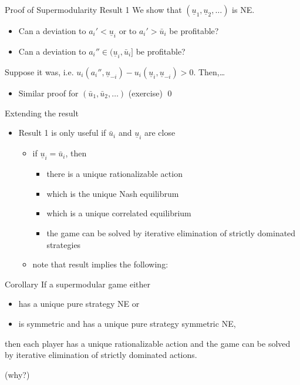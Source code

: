 \documentclass[bigger]{beamer}
\begin{document}
\begin{frame}[label={sec:orgheadline10}]{Proof of Supermodularity Result 1}
We show that \((\underline u_1,\underline u_2,\dots)\) is NE. 
\begin{itemize}
\item Can a deviation to \(a_i'<\underline u_i\) or to \(a_i'>\bar u_i\) be profitable?
\end{itemize}

\vspace*{2cm}

\begin{itemize}
\item Can a deviation to \(a_i''\in(\underline u_i,\bar u_i]\) be profitable?\\
\end{itemize}
Suppose it was, i.e. \(u_i(a_i'',\underline u_{-i})-u_i(\underline u_i,\underline u_{-i})>0\). Then,\dots{}

\vspace*{2.5cm}

\begin{itemize}
\item Similar proof for \((\bar u_1,\bar u_2,\dots)\) (exercise) \hfill\qed
\end{itemize}
\end{frame}

\begin{frame}[label={sec:orgheadline11}]{Extending the result}
\begin{itemize}
\item Result 1 is only useful if \(\bar u_i\) and \(\underline u_i\) are close
\begin{itemize}
\item if \(\underline u_i=\bar u_i\), then
\begin{itemize}
\item there is a unique  rationalizable action
\item which is the unique Nash equilibrum
\item which is a unique correlated equilibrium
\item the game can be solved by iterative elimination of strictly dominated strategies
\end{itemize}
\item note that result implies the following:
\end{itemize}
\end{itemize}
\begin{block}{Corollary}
If a supermodular game  either
\begin{itemize}
\item has a unique pure strategy NE or
\item is symmetric and has a unique pure strategy symmetric NE,
\end{itemize}

then each player has a unique rationalizable action and the game can be solved by iterative elimination of strictly dominated actions. 
\end{block}
(why?)
\end{frame}
\end{document}

